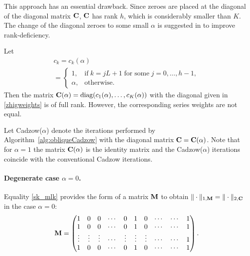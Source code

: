 \documentclass[sii]{ipart}
\begin{document}
This approach has an essential drawback. Since zeroes are placed at the diagonal of the diagonal matrix $\mathbf{C}$, $\mathbf{C}$ has rank $h$, which is considerably smaller than $K$. The change of the diagonal zeroes to some small $\alpha$ is suggested in \cite{Gillard2014} to improve rank-deficiency.

Let
\begin{multline}\label{zhigweights}
c_k = c_k(\alpha) \\ = \begin{cases}
1, & \text{if} \; k = jL+1 \; \text{for some} \; j = 0, \ldots, h-1, \\
\alpha, & \text{otherwise.}
\end{cases}
\end{multline}
Then the matrix $\mathbf{C}(\alpha)=\mathop{\mathrm{diag}}(c_1(\alpha),\ldots,c_K(\alpha))$ with the diagonal given in \eqref{zhigweights} is of full rank.
However, the corresponding series weights are not equal.

Let Cadzow($\alpha$) denote the iterations performed by Algorithm~\ref{alg:obliqueCadzow} with the diagonal matrix $\mathbf{C}=\mathbf{C}(\alpha)$.
	Note that for $\alpha=1$ the matrix $\mathbf{C}(\alpha)$ is the identity matrix and the Cadzow($\alpha$) iterations coincide with the conventional Cadzow iterations.

\paragraph*{Degenerate case $\alpha=0$.}

Equality \eqref{sk_mlk} provides the form of a matrix $\mathbf{M}$ to obtain $\|\cdot\|_{1, \mathbf{M}} = \|\cdot\|_{2, \mathbf{C}}$ in the case $\alpha = 0$:
\begin{equation}
\label{eq:degenerateM}
\bfM = \begin{pmatrix}
1 & 0 & 0 & \cdots & 0 & 1 & 0 & \cdots & \cdots & 1 \\
1 & 0 & 0 & \cdots & 0 & 1 & 0 & \cdots & \cdots & 1 \\
\vdots & \vdots & \vdots & \cdots & \vdots & \vdots & \vdots & \cdots & \cdots & 1 \\
1 & 0 & 0 & \cdots & 0 & 1 & 0 & \cdots & \cdots & 1
\end{pmatrix}.
\end{equation}
\end{document}
